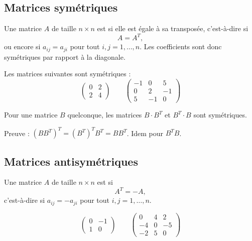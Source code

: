 \documentclass[class=report,crop=false]{standalone}
\begin{document}
\subsection{Matrices symétriques}


\begin{definition}
Une matrice $A$ de taille $n \times n$ est  si elle est égale
à sa transposée, c'est-à-dire si
$$A = A^T,$$
ou encore si $a_{ij}=a_{ji}$ pour tout $i,j=1, \ldots, n$.
Les coefficients sont donc symétriques par rapport à la diagonale.
\end{definition}

\begin{exemple} Les matrices suivantes sont symétriques :
 $$ \begin{pmatrix}
 0 & 2\\
 2 & 4\end{pmatrix} \qquad
\begin{pmatrix}
 -1 & 0 & 5\\
 0 & 2 & -1\\
 5 & -1 & 0\end{pmatrix}
$$
\end{exemple}

\begin{exemple}
Pour une matrice $B$ quelconque, les matrices $B \cdot B^T$ et $B^T \cdot B$ sont symétriques.

Preuve : $(BB^T)^T = (B^T)^T B^T = BB^T$. Idem pour $B^TB$.
\end{exemple}


\subsection{Matrices antisymétriques}

\begin{definition}
Une matrice $A$ de taille $n \times n$ est  si
$$A^T = -A,$$
c'est-à-dire si $a_{ij} = -a_{ji}$ pour tout $i,j=1, \ldots, n.$
\end{definition}

\begin{exemple}
$$\begin{pmatrix}
0 & -1\\
1 & 0
\end{pmatrix} \qquad
\begin{pmatrix}
0 & 4 & 2\\
-4 & 0 & -5\\
-2 & 5 & 0
\end{pmatrix}$$
\end{exemple}
\end{document}
